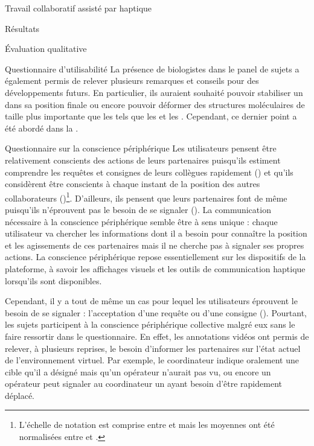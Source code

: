 \documentclass[myfrancais,ngerman,english,french]{mythesis}
\begin{document}
\begin{mychapter}{Travail collaboratif assisté par haptique}
\begin{mysection}{Résultats}
\begin{mysubsection}{Évaluation qualitative}
\begin{mysubsubsection}{Questionnaire d'utilisabilité}
					La présence de biologistes dans le panel de sujets a également permis de relever plusieurs remarques et conseils pour des développements futurs.
					En particulier, ils auraient souhaité pouvoir stabiliser un  dans sa position finale ou encore pouvoir déformer des structures moléculaires de taille plus importante que les  tels que les \myhelice* et les \myfeuillet*.
					Cependant, ce dernier point a été abordé dans la .
				\end{mysubsubsection}
				\begin{mysubsubsection}{Questionnaire sur la conscience périphérique}
					Les utilisateurs pensent être relativement conscients des actions de leurs partenaires puisqu'ils estiment comprendre les requêtes et consignes de leurs collègues rapidement () et qu'ils considèrent être conscients à chaque instant de la position des autres collaborateurs ()\footnote{L'échelle de notation est comprise entre  et  mais les moyennes ont été normalisées entre  et .}.
					D'ailleurs, ils pensent que leurs partenaires font de même puisqu'ils n'éprouvent pas le besoin de se signaler ().
					La communication nécessaire à la conscience périphérique semble être à sens unique : chaque utilisateur va chercher les informations dont il a besoin pour connaître la position et les agissements de ces partenaires mais il ne cherche pas à signaler ses propres actions.
					La conscience périphérique repose essentiellement sur les dispositifs de la plateforme, à savoir les affichages visuels et les outils de communication haptique lorsqu'ils sont disponibles.

					Cependant, il y a tout de même un cas pour lequel les utilisateurs éprouvent le besoin de se signaler : l'acceptation d'une requête ou d'une consigne ().
					Pourtant, les sujets participent à la conscience périphérique collective malgré eux sans le faire ressortir dans le questionnaire.
					En effet, les annotations vidéos ont permis de relever, à plusieurs reprises, le besoin d'informer les partenaires sur l'état actuel de l'environnement virtuel.
					Par exemple, le coordinateur indique oralement une cible qu'il a désigné mais qu'un opérateur n'aurait pas vu, ou encore un opérateur peut signaler au coordinateur un  ayant besoin d'être rapidement déplacé.


\end{mysubsubsection}
\end{mysubsection}
\end{mysection}
\end{mychapter}
\end{document}
